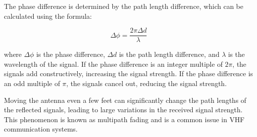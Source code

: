 The phase difference is determined by the path length difference, which can be calculated using the formula:

\[
\Delta \phi = \frac{2\pi \Delta d}{\lambda}
\]

where \(\Delta \phi\) is the phase difference, \(\Delta d\) is the path length difference, and \(\lambda\) is the wavelength of the signal. If the phase difference is an integer multiple of \(2\pi\), the signals add constructively, increasing the signal strength. If the phase difference is an odd multiple of \(\pi\), the signals cancel out, reducing the signal strength.

Moving the antenna even a few feet can significantly change the path lengths of the reflected signals, leading to large variations in the received signal strength. This phenomenon is known as multipath fading and is a common issue in VHF communication systems.

